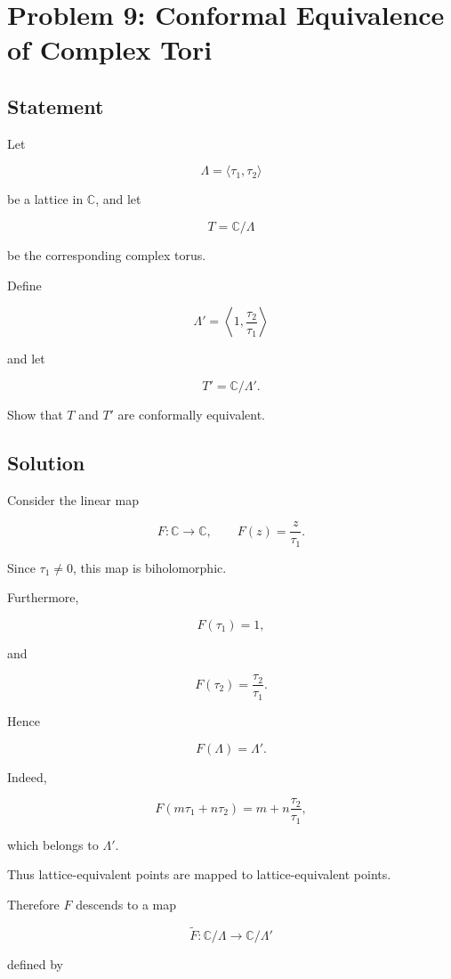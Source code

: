 \documentclass[12pt,a4paper]{article}
\theoremstyle{notespace}
\begin{document}
\section{Problem 9: Conformal Equivalence of Complex Tori}

\subsection*{Statement}

Let

\[
\Lambda=\langle\tau_1,\tau_2\rangle
\]

be a lattice in \(\mathbb C\), and let

\[
T=\mathbb C/\Lambda
\]

be the corresponding complex torus.

Define

\[
\Lambda'
=
\left\langle
1,
\frac{\tau_2}{\tau_1}
\right\rangle
\]

and let

\[
T'
=
\mathbb C/\Lambda'.
\]

Show that \(T\) and \(T'\) are conformally equivalent.

\subsection*{Solution}

Consider the linear map

\[
F:\mathbb C\to\mathbb C,
\qquad
F(z)=\frac{z}{\tau_1}.
\]

Since \(\tau_1\neq0\), this map is biholomorphic.

Furthermore,

\[
F(\tau_1)=1,
\]

and

\[
F(\tau_2)
=
\frac{\tau_2}{\tau_1}.
\]

Hence

\[
F(\Lambda)
=
\Lambda'.
\]

Indeed,

\[
F(m\tau_1+n\tau_2)
=
m+n\frac{\tau_2}{\tau_1},
\]

which belongs to \(\Lambda'\).

Thus lattice-equivalent points are mapped to lattice-equivalent points.

Therefore \(F\) descends to a map

\[
\widetilde F:
\mathbb C/\Lambda
\longrightarrow
\mathbb C/\Lambda'
\]

defined by
\end{document}
